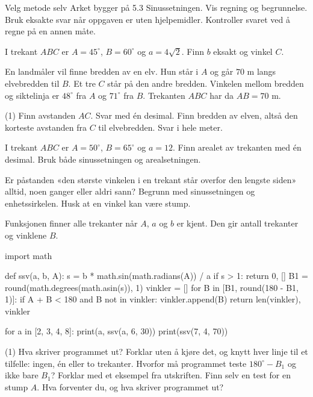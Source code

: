 
\begin{infoboks}{Velg metode selv}
Arket bygger på 5.3 Sinussetningen. Vis regning og begrunnelse. Bruk eksakte svar når oppgaven er uten hjelpemidler.
Kontroller svaret ved å regne på en annen måte.
\end{infoboks}


I trekant $ABC$ er $A = 45^\circ$, $B = 60^\circ$ og $a = 4\sqrt2$. Finn $b$ eksakt og vinkel $C$.

En landmåler vil finne bredden av en elv. Hun står i $A$ og går $70$ m langs elvebredden til $B$. Et tre $C$ står på den andre bredden.
Vinkelen mellom bredden og siktelinja er $48^\circ$ fra $A$ og $71^\circ$ fra $B$. Trekanten $ABC$ har da $AB = 70$ m.
\begin{tasks}(1)
  \task Finn avstanden $AC$. Svar med én desimal.
  \task Finn bredden av elven, altså den korteste avstanden fra $C$ til elvebredden. Svar i hele meter.
\end{tasks}

I trekant $ABC$ er $A = 50^\circ$, $B = 65^\circ$ og $a = 12$. Finn arealet av trekanten med én desimal.
Bruk både sinussetningen og arealsetningen.


Er påstanden «den største vinkelen i en trekant står overfor den lengste siden» alltid, noen ganger eller aldri sann?
Begrunn med sinussetningen og enhetssirkelen. Husk at en vinkel kan være stump.

Funksjonen finner alle trekanter når $A$, $a$ og $b$ er kjent. Den gir antall trekanter og vinklene $B$.
\begin{kode}
import math

def ssv(a, b, A):
    s = b * math.sin(math.radians(A)) / a
    if s > 1:
        return 0, []
    B1 = round(math.degrees(math.asin(s)), 1)
    vinkler = []
    for B in [B1, round(180 - B1, 1)]:
        if A + B < 180 and B not in vinkler:
            vinkler.append(B)
    return len(vinkler), vinkler

for a in [2, 3, 4, 8]:
    print(a, ssv(a, 6, 30))
print(ssv(7, 4, 70))
\end{kode}
\begin{tasks}(1)
  \task Hva skriver programmet ut? Forklar uten å kjøre det, og knytt hver linje til et tilfelle: ingen, én eller to trekanter.
  \task Hvorfor må programmet teste $180^\circ - B_1$ og ikke bare $B_1$? Forklar med et eksempel fra utskriften.
  \task Finn selv en test for en stump $A$. Hva forventer du, og hva skriver programmet ut?
\end{tasks}

